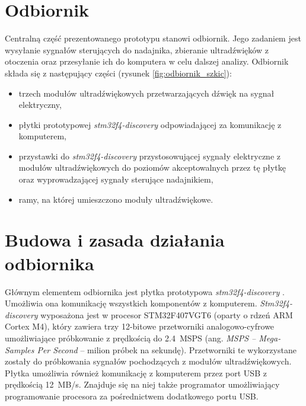 \section{Odbiornik}

Centralną część prezentowanego prototypu stanowi odbiornik.
Jego zadaniem jest wysyłanie sygnałów sterujących do nadajnika, zbieranie ultradźwięków z otoczenia oraz przesyłanie 
ich do komputera w celu dalszej analizy.
Odbiornik składa się z następujący części (rysunek \ref{fig:odbiornik_szkic}):

\begin{itemize}
 \item trzech modułów ultradźwiękowych przetwarzających dźwięk na sygnał elektryczny,
 \item płytki prototypowej \textit{stm32f4-discovery} \cite{bib:stm32f4Discovery} odpowiadającej za komunikację z komputerem,
 \item przystawki do \textit{stm32f4-discovery} przystosowującej sygnały elektryczne z modułów ultradźwiękowych
  do poziomów akceptowalnych przez tę płytkę oraz wyprowadzającej sygnały sterujące nadajnikiem,
 \item ramy, na której umieszczono moduły ultradźwiękowe.
\end{itemize}




\section{Budowa i zasada działania odbiornika}

Głównym elementem odbiornika jest płytka prototypowa \textit{stm32f4-discovery} \cite{bib:stm32f4Discovery}.
 Umożliwia ona komunikację wszystkich komponentów z komputerem.
\textit{Stm32f4-discovery} wyposażona jest w procesor STM32F407VGT6 \cite{bib:stm32f407} (oparty o rdzeń ARM Cortex M4), 
który zawiera trzy 12-bitowe przetworniki
analogowo-cyfrowe umożliwiające próbkowanie z prędkością do \SI{2,4}{MSPS} 
(ang. \textit{MSPS -- Mega-Samples Per Second} -- milion próbek na sekundę). Przetworniki te wykorzystane zostały do próbkowania
sygnałów pochodzących z modułów ultradźwiękowych. Płytka umożliwia również komunikację z komputerem przez 
port USB z prędkością \SI{12}{MB/s}. Znajduje się na niej także programator
umożliwiający programowanie procesora za pośrednictwem dodatkowego portu USB.

